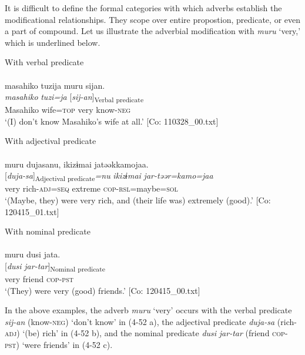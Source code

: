 It is difficult to define the formal categories with which adverbs establish the modificational relationships. They scope over entire propostion, predicate, or even a part of compound. Let us illustrate the adverbial modification with \textit{muru} ‘very,’ which is underlined below.

\ea  \ea With verbal predicate \label{ex:4.52}\\\\
\glll    masahiko  tuzija  muru  sijan.\\
    \textit{masahiko}  \textit{tuzi=ja}  \textit{}  [\textit{sij-an}]\textsubscript{Verbal predicate}\\
    Masahiko  wife=\textsc{top}  very  know-\textsc{neg}\\
    \glt     ‘(I) don’t know Masahiko’s wife at all.’ [Co: 110328\_00.txt]

  \ex With adjectival predicate\\\\
\glll    muru  dujasanu,  ikizɨmai  jatəəkkamojaa.\\
    \textit{}  [\textit{duja-sa}]\textsubscript{Adjectival predicate}\textit{=nu}  \textit{ikizɨmai}  \textit{jar-təər=kamo=jaa}\\
    very  rich-\textsc{adj}=\textsc{seq}  extreme  \textsc{cop}-\textsc{rsl}=maybe=\textsc{sol}\\
    \glt     ‘(Maybe, they) were very rich, and (their life was) extremely (good).’ [Co: 120415\_01.txt]

\ex With nominal predicate\\\\
\glll  muru  dusi  jata.\\
    \textit{}  [\textit{dusi}  \textit{jar-tar}]\textsubscript{Nominal predicate}\\
    very  friend  \textsc{cop}-\textsc{pst}\\
    \glt     ‘(They) were very (good) friends.’ [Co: 120415\_00.txt]
    \z
\z

In the above examples, the adverb \textit{muru} ‘very’ occurs with the verbal predicate \textit{sij-an} (know-\textsc{neg}) ‘don’t know’ in (4-52 a), the adjectival predicate \textit{duja-sa} (rich-\textsc{adj}) ‘(be) rich’ in (4-52 b), and the nominal predicate \textit{dusi} \textit{jar-tar} (friend \textsc{cop}-\textsc{pst}) ‘were friends’ in (4-52 c).

